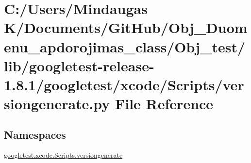 \hypertarget{_obj__test_2lib_2googletest-release-1_88_81_2googletest_2xcode_2_scripts_2versiongenerate_8py}{}\section{C\+:/\+Users/\+Mindaugas K/\+Documents/\+Git\+Hub/\+Obj\+\_\+\+Duomenu\+\_\+apdorojimas\+\_\+class/\+Obj\+\_\+test/lib/googletest-\/release-\/1.8.1/googletest/xcode/\+Scripts/versiongenerate.py File Reference}
\label{_obj__test_2lib_2googletest-release-1_88_81_2googletest_2xcode_2_scripts_2versiongenerate_8py}
\subsection*{Namespaces}
\begin{DoxyCompactItemize}
\item 
 \mbox{\hyperlink{namespacegoogletest_1_1xcode_1_1_scripts_1_1versiongenerate}{googletest.\+xcode.\+Scripts.\+versiongenerate}}
\end{DoxyCompactItemize}
